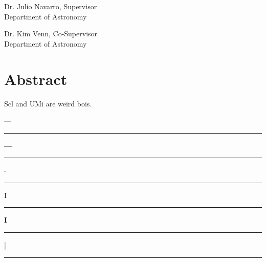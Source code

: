 \documentclass[12pt,oneside,letterpaper]{report}
\newcommand{\skipline}{\vspace{\baselineskip}}
\begin{document}
Dr. Julio Navarro, Supervisor\\
Department of Astronomy \\
\skipline

\noindent Dr. Kim Venn, Co-Supervisor\\
Department of Astronomy


\chapter*{Abstract}
Scl and UMi are weird bois. 


\newlength{\myw}
\newlength{\myl}

---\rule[2.4pt]{12pt}{0.6pt}
\settowidth{\myw}{---}\the\myw

{\bf ---}\rule[2.2pt]{12pt}{1.1pt}

\settoheight{\myl}{---}\the\myl

-\rule[2.4pt]{3pt}{0.75pt}
I\rule{1.2pt}{8pt}
{\bf I}\rule{2.0pt}{8pt}
|\rule[-2pt]{0.6pt}{12pt}
% 
% 
% 
% 
% 
% 
% 
\end{document}
